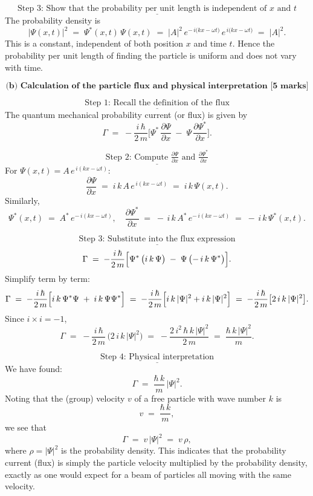 \documentclass{article}
\begin{document}
\[
\underline{\text{Step 3: Show that the probability per unit length is independent of \(x\) and \(t\)}}
\]
The probability density is
\[
\bigl|\Psi(x,t)\bigr|^2
\;=\;
\Psi^*(x,t)\,\Psi(x,t)
\;=\;
\bigl|A\bigr|^2\,e^{-\,i\bigl(k x - \omega t\bigr)}\,e^{\,i\bigl(k x - \omega t\bigr)}
\;=\;
\bigl|A\bigr|^2.
\]
This is a constant, independent of both position \(x\) and time \(t\). Hence the probability per unit length of finding the particle is uniform and does not vary with time.

\[
\textbf{(b) Calculation of the particle flux and physical interpretation [5 marks]}
\]

\[
\underline{\text{Step 1: Recall the definition of the flux}}
\]
The quantum mechanical probability current (or flux) is given by
\[
\Gamma
\;=\;
-\frac{i\,\hbar}{2\,m}
\biggl[
\Psi^*\,\frac{\partial\Psi}{\partial x}
\;-\;
\Psi\,\frac{\partial\Psi^*}{\partial x}
\biggr].
\]

\[
\underline{\text{Step 2: Compute \(\tfrac{\partial\Psi}{\partial x}\) and \(\tfrac{\partial\Psi^*}{\partial x}\)}}
\]
For \(\Psi(x,t) = A\, e^{\,i(kx - \omega t)}\):
\[
\frac{\partial\Psi}{\partial x}
\;=\;
i\,k\,A\, e^{\,i(kx - \omega t)}
\;=\;
i\,k\,\Psi(x,t).
\]
Similarly,
\[
\Psi^*(x,t)
\;=\;
A^*\, e^{-\,i(kx - \omega t)},
\quad
\frac{\partial\Psi^*}{\partial x}
\;=\;
-\,i\,k\,A^*\, e^{-\,i(kx - \omega t)}
\;=\;
-\,i\,k\,\Psi^*(x,t).
\]

\[
\underline{\text{Step 3: Substitute into the flux expression}}
\]
\[
\Gamma
\;=\;
-\frac{i\,\hbar}{2\,m}
\Bigl[
\Psi^*\,\bigl(i\,k\,\Psi\bigr)
\;-\;
\Psi\,\bigl(-\,i\,k\,\Psi^*\bigr)
\Bigr].
\]
Simplify term by term:
\[
\Gamma
\;=\;
-\frac{i\,\hbar}{2\,m}
\Bigl[
i\,k\,\Psi^*\Psi
\;+\;
i\,k\,\Psi\Psi^*
\Bigr]
\;=\;
-\frac{i\,\hbar}{2\,m}
\Bigl[
i\,k\,|\Psi|^2 + i\,k\,|\Psi|^2
\Bigr]
\;=\;
-\frac{i\,\hbar}{2\,m}
\bigl[
2\,i\,k\,|\Psi|^2
\bigr].
\]
Since \(i \times i = -1\),
\[
\Gamma
\;=\;
-\frac{i\,\hbar}{2\,m}\,\bigl(2\,i\,k\,|\Psi|^2\bigr)
\;=\;
-\frac{2\,i^2\,\hbar\,k\,|\Psi|^2}{2\,m}
\;=\;
\frac{\hbar\,k\,|\Psi|^2}{m}.
\]

\[
\underline{\text{Step 4: Physical interpretation}}
\]
We have found:
\[
\Gamma
\;=\;
\frac{\hbar\,k}{m}\,\bigl|\Psi\bigr|^2.
\]
Noting that the (group) velocity \(v\) of a free particle with wave number \(k\) is
\[
v \;=\; \frac{\hbar\,k}{m},
\]
we see that
\[
\Gamma
\;=\;
v\,|\Psi|^2
\;=\;
v\,\rho,
\]
where \(\rho = |\Psi|^2\) is the probability density. This indicates that the probability current (flux) is simply the particle velocity multiplied by the probability density, exactly as one would expect for a beam of particles all moving with the same velocity.
\end{document}
